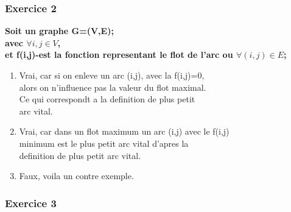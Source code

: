 \documentclass[]{article}
\begin{document}
\subsubsection{Exercice 2}

\textbf{Soit un graphe G=(V,E);\\avec $\forall i,j \in V$,\\
et f(i,j)-est la fonction representant le flot de l'arc ou $\forall (i,j)\in E$;\\}

\begin{enumerate}


\item Vrai, car si on enleve un arc (i,j), avec la f(i,j)=0,\\ alors on n'influence pas la valeur du flot maximal.\\
Ce qui correspondt a la definition de plus petit \\arc vital.

\item Vrai, car dans un flot maximum un arc (i,j) avec le f(i,j)\\ minimum est le plus petit arc vital d'apres la \\
definition de plus petit arc vital.
\item Faux, voila un contre exemple.


\usetikzlibrary{arrows}
\thispagestyle{empty}
\begin{center}
\end{center}
 
\end{enumerate} 

\subsubsection{Exercice 3}
\end{document}
